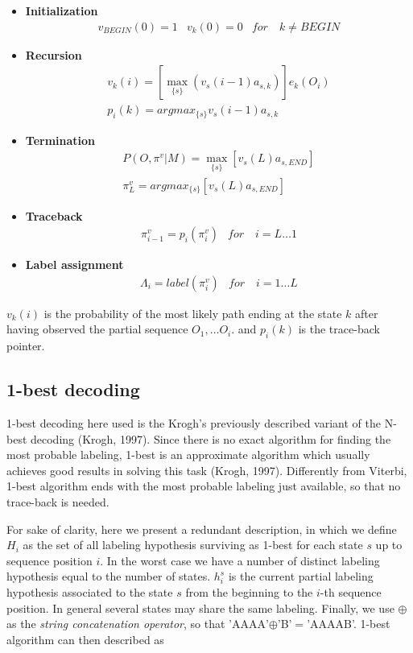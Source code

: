 \documentclass[11pt,english]{article}
\begin{document}
\begin{itemize}
\item {\bf Initialization} 
\begin{eqnarray*}
v_{BEGIN}(0)=1 & v_{k}(0)=0 & for \quad k \neq BEGIN
\end{eqnarray*}

\item {\bf Recursion}
\begin{eqnarray*}
v_{k}(i) = [ \max_{\{s\}}(v_{s}(i-1)a_{s,k})] e_{k}(O_{i}) \\
p_i(k)= argmax_{\{s\}} v_{s}(i-1)a_{s,k}
\end{eqnarray*}

\item {\bf Termination} 
\begin{eqnarray*}
P(O,\pi^v |M) = \max_{\{s\}}[v_s(L)a_{s,END}] \\
\pi^v_L=argmax_{\{s\}}[v_s(L)a_{s,END}]
\end{eqnarray*}

\item {\bf Traceback} 
\begin{eqnarray*}
\pi^v_{i-1}=p_i(\pi^v_{i}) & for \quad i=L \dots 1
\end{eqnarray*}
\item {\bf Label assignment} 
\begin{eqnarray*}
\Lambda_i=label(\pi^v_i) & for \quad i=1 \dots L
\end{eqnarray*}
\end{itemize}
$v_{k}(i)$ is the probability of the most likely path ending at the state 
$k$ after having observed the partial sequence $O_{1}, \dots O_i$. and 
$p_i(k)$ is the trace-back pointer.

\subsection*{1-best decoding}

1-best decoding here used is the Krogh's previously described 
variant of the N-best decoding (Krogh, 1997). Since there is 
no exact algorithm for finding the most probable labeling, 1-best 
is an approximate algorithm which usually achieves good results 
in solving this task (Krogh, 1997). 
Differently from Viterbi, 1-best algorithm ends with the
most probable labeling just available, so that no trace-back is needed.

For sake of clarity, here we present a redundant description, in which
we define $H_i$ as the set of all labeling hypothesis surviving as 1-best
for each state $s$ up to sequence position $i$. In the worst case
we have a number of distinct labeling hypothesis equal to the number
of states.
$h_i^s$ is the current partial labeling hypothesis associated to the state
$s$ from the beginning to the $i$-th sequence position. 
In general several states may share the same labeling. 
Finally, we use $\oplus$ as the {\em string concatenation operator}, so that
'AAAA'$\oplus$'B'$=$'AAAAB'.
1-best algorithm can then described as
\end{document}
